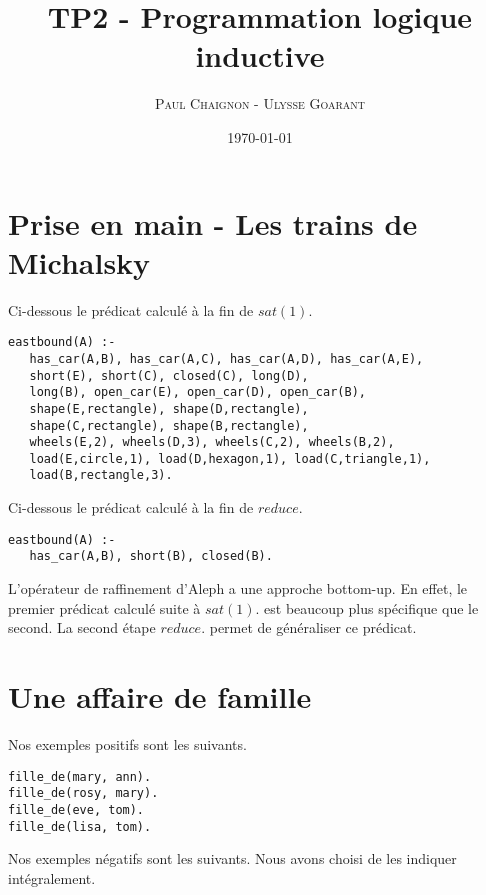 \documentclass[a4paper,12pt]{article}
\title{TP2 - Programmation logique inductive}
\author{\textsc{Paul Chaignon} - \textsc{Ulysse Goarant}}
\date{\today}
\begin{document}
\lstset{language=Prolog}

\maketitle

\section{Prise en main - Les trains de Michalsky}

Ci-dessous le prédicat calculé à la fin de $sat(1).$
\begin{lstlisting}[frame=single]
eastbound(A) :-
   has_car(A,B), has_car(A,C), has_car(A,D), has_car(A,E),
   short(E), short(C), closed(C), long(D),
   long(B), open_car(E), open_car(D), open_car(B),
   shape(E,rectangle), shape(D,rectangle),
   shape(C,rectangle), shape(B,rectangle),
   wheels(E,2), wheels(D,3), wheels(C,2), wheels(B,2),
   load(E,circle,1), load(D,hexagon,1), load(C,triangle,1),
   load(B,rectangle,3).
\end{lstlisting}

Ci-dessous le prédicat calculé à la fin de $reduce.$
\begin{lstlisting}[frame=single]
eastbound(A) :-
   has_car(A,B), short(B), closed(B).
\end{lstlisting}

L'opérateur de raffinement d'Aleph a une approche bottom-up.
En effet, le premier prédicat calculé suite à $sat(1).$ est beaucoup plus spécifique que le second.
La second étape $reduce.$ permet de généraliser ce prédicat.

\section{Une affaire de famille}
Nos exemples positifs sont les suivants.

\begin{lstlisting}[frame=single]
fille_de(mary, ann).
fille_de(rosy, mary).
fille_de(eve, tom).
fille_de(lisa, tom).
\end{lstlisting}

Nos exemples négatifs sont les suivants. Nous avons choisi de les indiquer intégralement.
\end{document}
